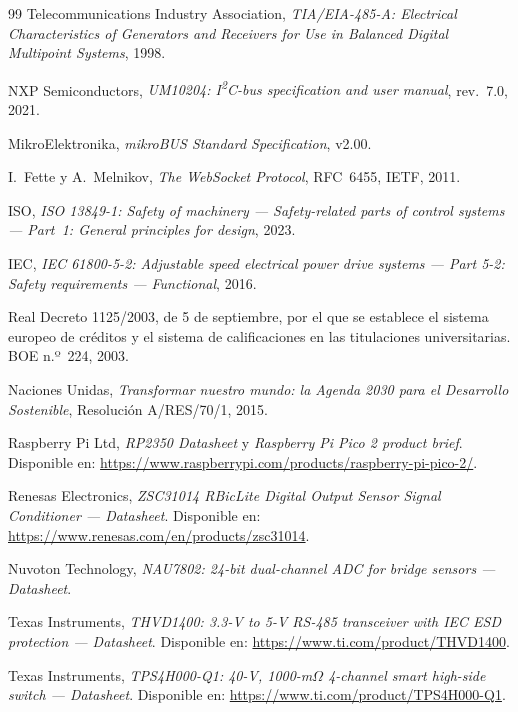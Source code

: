 \begin{thebibliography}{99}
Telecommunications Industry Association, \emph{TIA/EIA-485-A: Electrical Characteristics of
Generators and Receivers for Use in Balanced Digital Multipoint Systems}, 1998.

NXP Semiconductors, \emph{UM10204: I\textsuperscript{2}C-bus specification and user manual},
rev.~7.0, 2021.

MikroElektronika, \emph{mikroBUS Standard Specification}, v2.00.

I.~Fette y A.~Melnikov, \emph{The WebSocket Protocol}, RFC~6455, IETF, 2011.

ISO, \emph{ISO 13849-1: Safety of machinery --- Safety-related parts of control systems ---
Part~1: General principles for design}, 2023.

IEC, \emph{IEC 61800-5-2: Adjustable speed electrical power drive systems --- Part 5-2: Safety
requirements --- Functional}, 2016.

Real Decreto 1125/2003, de 5 de septiembre, por el que se establece el sistema europeo de
créditos y el sistema de calificaciones en las titulaciones universitarias. BOE n.º~224, 2003.

Naciones Unidas, \emph{Transformar nuestro mundo: la Agenda 2030 para el Desarrollo
Sostenible}, Resolución A/RES/70/1, 2015.

Raspberry Pi Ltd, \emph{RP2350 Datasheet} y \emph{Raspberry Pi Pico 2 product brief}.
Disponible en: \url{https://www.raspberrypi.com/products/raspberry-pi-pico-2/}.

Renesas Electronics, \emph{ZSC31014 RBicLite Digital Output Sensor Signal Conditioner ---
Datasheet}. Disponible en: \url{https://www.renesas.com/en/products/zsc31014}.

Nuvoton Technology, \emph{NAU7802: 24-bit dual-channel ADC for bridge sensors --- Datasheet}.

Texas Instruments, \emph{THVD1400: 3.3-V to 5-V RS-485 transceiver with IEC ESD protection ---
Datasheet}. Disponible en: \url{https://www.ti.com/product/THVD1400}.

Texas Instruments, \emph{TPS4H000-Q1: 40-V, 1000-m$\Omega$ 4-channel smart high-side switch ---
Datasheet}. Disponible en: \url{https://www.ti.com/product/TPS4H000-Q1}.


\end{thebibliography}
